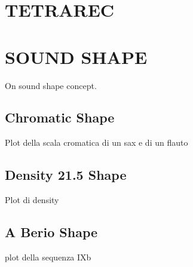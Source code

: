 \documentclass{article}
\begin{document}
\section{TETRAREC}
\label{sec:tetrarec}



\section{SOUND SHAPE}
\label{sec:sshape}

On sound shape concept.

\subsection{Chromatic Shape}
\label{sec:cshape}

Plot della scala cromatica di un sax e di un flauto

\subsection{Density 21.5 Shape}
\label{sec:dshape}

Plot di density

\subsection{A Berio Shape}
\label{sec:bshape}

plot della sequenza IXb

%
\end{document}
